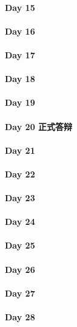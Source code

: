 \documentclass[UTF8,a4paper,8pt]{ctexart}
\begin{document}
 	 \paragraph{Day 15      \quad     }
 	 \paragraph{Day 16      \quad     }
 	 \paragraph{Day 17      \quad     }
 	 \paragraph{Day 18      \quad     }
 	 \paragraph{Day 19      \quad     }
 	 \paragraph{Day 20   正式答辩   \quad     }
 	 \paragraph{Day 21      \quad     }
 	 \paragraph{Day 22      \quad     }
 	 \paragraph{Day 23      \quad     }
 	 \paragraph{Day 24      \quad     }
 	 \paragraph{Day 25      \quad     }
 	 \paragraph{Day 26      \quad     }
 	 \paragraph{Day 27      \quad     }
 	 \paragraph{Day 28      \quad     }
\end{document}
